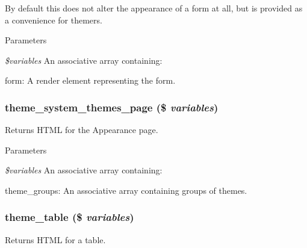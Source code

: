 By default this does not alter the appearance of a form at all, but is provided as a convenience for themers.


\begin{DoxyParams}{Parameters}
\item[{\em \$variables}]An associative array containing:
\begin{DoxyItemize}
\item form: A render element representing the form. 
\end{DoxyItemize}\end{DoxyParams}
\hypertarget{group__themeable_gaea95a9176e04f5ad0707f3adfc59efa6}{
\subsubsection[{theme\_\-system\_\-themes\_\-page}]{\setlength{\rightskip}{0pt plus 5cm}theme\_\-system\_\-themes\_\-page (\$ {\em variables})}}
\label{group__themeable_gaea95a9176e04f5ad0707f3adfc59efa6}
Returns HTML for the Appearance page.


\begin{DoxyParams}{Parameters}
\item[{\em \$variables}]An associative array containing:
\begin{DoxyItemize}
\item theme\_\-groups: An associative array containing groups of themes. 
\end{DoxyItemize}\end{DoxyParams}
\hypertarget{group__themeable_ga9e35aa108c35f87b588197138a51823d}{
\subsubsection[{theme\_\-table}]{\setlength{\rightskip}{0pt plus 5cm}theme\_\-table (\$ {\em variables})}}
\label{group__themeable_ga9e35aa108c35f87b588197138a51823d}
Returns HTML for a table.


